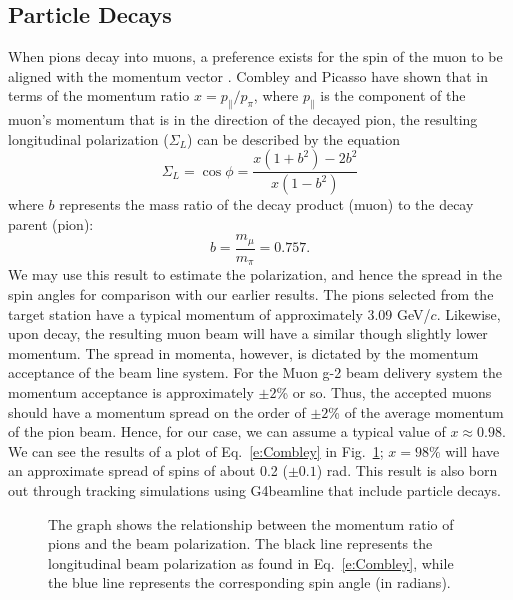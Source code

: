 \documentclass[12pt]{article}
\begin{document}
\subsection{Particle Decays}
When pions decay into muons, a preference exists for the spin of the muon to be aligned with the momentum vector \cite{Garwin}.  Combley and Picasso \cite{Combley} have shown that in terms of the momentum ratio $x = p_\parallel / p_\pi$, where $p_\parallel$ is the component of the muon's momentum that is in the direction of the decayed pion, the resulting  longitudinal polarization ($\Sigma_L$) can be described by the equation
\begin{equation}
\Sigma_L = \cos \phi = \frac{x (1 + b^2) - 2b^2}{x (1 - b^2)} \label{e:Combley}
\end{equation}
where $b$ represents the mass ratio of the decay product (muon) to the decay parent (pion): 
\begin{equation}
b = \frac{m_\mu}{m_\pi} = 0.757.
\end{equation}
We may use this result to estimate the polarization, and hence the spread in the spin angles for comparison with our earlier results.  The pions selected from the target station have a typical momentum of approximately 3.09 GeV/$c$.  Likewise, upon decay, the resulting muon beam will have a similar though slightly lower momentum.  The spread in momenta, however, is dictated by the momentum acceptance of the beam line system.   For the Muon g-2 beam delivery system the momentum acceptance is approximately $\pm 2$\% or so.  Thus, the accepted muons should have a momentum spread on the order of $\pm 2$\% of the average momentum of the pion beam.  Hence, for our case, we can assume a typical value of $x \approx 0.98$.  We can see the results of a plot of Eq.~\ref{e:Combley} in Fig.~\ref{fig:phi_decays}; $x = 98 \%$  will have an approximate spread of spins of about 0.2 ($\pm 0.1$) rad.  This result is also born out through tracking simulations using G4beamline that include particle decays.
\begin{figure}[htb]
\begin{center}
\caption{The graph shows the relationship between the momentum ratio of pions and the beam polarization. The black line represents the longitudinal beam polarization as found in Eq.~\ref{e:Combley}, while the blue line represents the corresponding spin angle (in radians).}
\label{fig:phi_decays}
\end{center}
\end{figure}
\end{document}
